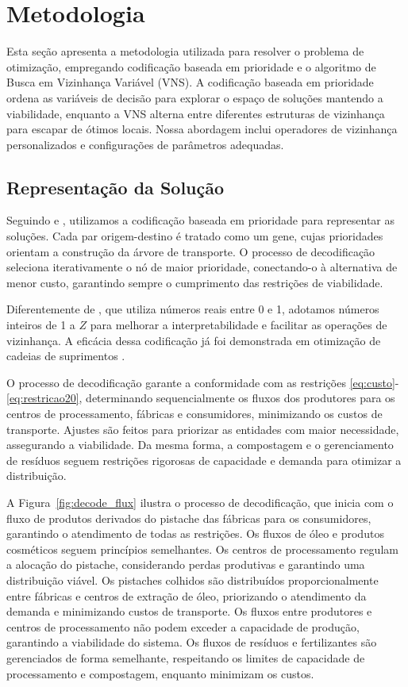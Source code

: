 \documentclass[a4paper]{ifacconf}
\begin{document}
\section{Metodologia}
\label{sec:heuristic1}

Esta seção apresenta a metodologia utilizada para resolver o problema de otimização, empregando codificação baseada em prioridade \citep{gen2006genetic} e o algoritmo de Busca em Vizinhança Variável (VNS). A codificação 
baseada em prioridade ordena as variáveis de decisão para explorar o espaço de soluções mantendo a viabilidade, enquanto a VNS alterna entre diferentes estruturas de vizinhança para escapar de ótimos locais. 
Nossa abordagem inclui operadores de vizinhança personalizados e configurações de parâmetros adequadas.

\subsection{Representação da Solução}
Seguindo \cite{rajabi2023utilizing} e \cite{gen2006genetic}, utilizamos a codificação baseada em prioridade para representar as soluções. Cada par origem-destino é tratado como um gene, cujas prioridades 
orientam a construção da árvore de transporte. O processo de decodificação seleciona iterativamente o nó de maior prioridade, conectando-o à alternativa de menor custo, garantindo sempre o cumprimento das 
restrições de viabilidade.

Diferentemente de \cite{rajabi2023utilizing}, que utiliza números reais entre 0 e 1, adotamos números inteiros de 1 a $Z$ para melhorar a interpretabilidade e facilitar as operações de vizinhança. A eficácia 
dessa codificação já foi demonstrada em otimização de cadeias de suprimentos \citep{pishvaee2010memetic,altiparmak2006genetic,liu2023integrated}.

O processo de decodificação garante a conformidade com as restrições \eqref{eq:custo}-\eqref{eq:restricao20}, determinando sequencialmente os fluxos dos produtores para os centros de processamento, fábricas e 
consumidores, minimizando os custos de transporte. Ajustes são feitos para priorizar as entidades com maior necessidade, assegurando a viabilidade. Da mesma forma, a compostagem e o gerenciamento de resíduos 
seguem restrições rigorosas de capacidade e demanda para otimizar a distribuição.

A Figura~\ref{fig:decode_flux} ilustra o processo de decodificação, que inicia com o fluxo de produtos derivados do pistache das fábricas para os consumidores, garantindo o atendimento de todas as restrições. 
Os fluxos de óleo e produtos cosméticos seguem princípios semelhantes. Os centros de processamento regulam a alocação do pistache, considerando perdas produtivas e garantindo uma distribuição viável. Os pistaches
colhidos são distribuídos proporcionalmente entre fábricas e centros de extração de óleo, priorizando o atendimento da demanda e minimizando custos de transporte. Os fluxos entre produtores e centros de 
processamento não podem exceder a capacidade de produção, garantindo a viabilidade do sistema. Os fluxos de resíduos e fertilizantes são gerenciados de forma semelhante, respeitando os limites de capacidade 
de processamento e compostagem, enquanto minimizam os custos.
\end{document}
